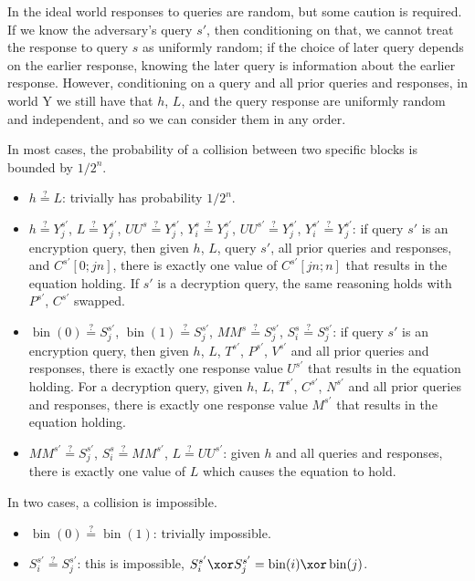 \documentclass[letterpaper,11pt]{article}
\newcommand*{\MM}{\mathit{MM}}
\newcommand*{\qeq}{\stackrel{\text{?}}{=}}
\newcommand*{\UU}{\mathit{UU}}
\DeclareMathOperator{\fromint}{bin}
\begin{document}
In the ideal world responses to queries are random,
but some caution is required.
If we know the adversary's query \(s'\), then conditioning on that,
we cannot treat the response to query \(s\) as uniformly random;
if the choice of later query depends on the earlier response,
knowing the later query is information about the earlier response.
However, conditioning on a query and all prior queries and responses,
in world Y we still have that \(h\), \(L\), and the
query response are uniformly random and independent,
and so we can consider them in any order.

In most cases, the probability of a collision
between two specific blocks is bounded by \(1/2^n\).

\begin{itemize}
    \item \(h \qeq L\): trivially has probability \(1/2^n\).
    \item
    \(h \qeq Y_j^{s'}\),
    \(L \qeq Y_j^{s'}\),
    \(\UU^s \qeq Y_j^{s'}\),
    \(Y_i^s \qeq Y_j^{s'}\),
    \(\UU^{s'} \qeq Y_j^{s'}\), 
    \(Y_i^{s'} \qeq Y_j^{s'}\): 
    if query \(s'\) is an encryption query,
    then given \(h\), \(L\), query \(s'\), 
    all prior queries and responses, and
    \(C^{s'}[0;jn]\), there is exactly one value of
    \(C^{s'}[jn;n]\) that results in the equation holding.
    If \(s'\) is a decryption query, the same reasoning holds
    with \(P^{s'}\), \(C^{s'}\) swapped.
    \item 
    \(\fromint(0) \qeq S_j^{s'}\),
    \(\fromint(1) \qeq S_j^{s'}\),
    \(\MM^s \qeq S_j^{s'}\),
    \(S_i^s \qeq S_j^{s'}\):
    if query \(s'\) is an encryption query,
    then given \(h\), \(L\), \(T^{s'}\),
    \(P^{s'}\), \(V^{s'}\)
    and all prior queries and responses,
    there is exactly one response value \(U^{s'}\)
    that results in the equation holding.
    For a decryption query, 
    given \(h\), \(L\), \(T^{s'}\),
    \(C^{s'}\), \(N^{s'}\)
    and all prior queries and responses,
    there is exactly one response value \(M^{s'}\)
    that results in the equation holding.
    \item
    \(\MM^{s'} \qeq S_j^{s'}\),
    \(S_i^s \qeq \MM^{s'}\),
    \(L \qeq \UU^{s'}\):
    given \(h\) and all queries and responses,
    there is exactly one value of \(L\)
    which causes the equation to hold.
\end{itemize}

In two cases, a collision is impossible.

\begin{itemize}
    \item \(\fromint(0) \qeq \fromint(1)\): trivially impossible.
    \item 
    \(S_i^{s'} \qeq S_j^{s'}\):
    this is impossible, 
    \(S_i^{s'} \xor S_j^{s'} = \fromint(i) \xor \fromint(j)\).
\end{itemize}
\end{document}
